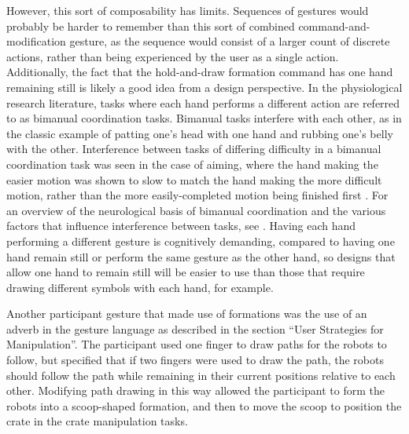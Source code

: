 However, this sort of composability has limits. 
Sequences of gestures would probably be harder to remember than this sort of combined command-and-modification gesture, as the sequence would consist of a larger count of discrete actions, rather than being experienced by the user as a single action. 
Additionally, the fact that the hold-and-draw formation command has one hand remaining still is likely a good idea from a design perspective. 
In the physiological research literature, tasks where each hand performs a different action are referred to as bimanual coordination tasks.
Bimanual tasks interfere with each other, as in the classic example of patting one's head with one hand and rubbing one's belly with the other. 
Interference between tasks of differing difficulty in a bimanual coordination task was seen in the case of aiming, where the hand making the easier motion was shown to slow to match the hand making the more difficult motion, rather than the more easily-completed motion being finished first \citep{fitts1954information}.
For an overview of the neurological basis of bimanual coordination and the various factors that influence interference between tasks, see \citep{swinnen2004two}. 
Having each hand performing a different gesture is cognitively demanding, compared to having one hand remain still or perform the same gesture as the other hand, so designs that allow one hand to remain still will be easier to use than those that require drawing different symbols with each hand, for example. 

Another participant gesture that made use of formations was the use of an adverb in the gesture language as described in the section ``User Strategies for Manipulation''. 
The participant used one finger to draw paths for the robots to follow, but specified that if two fingers were used to draw the path, the robots should follow the path while remaining in their current positions relative to each other. 
Modifying path drawing in this way allowed the participant to form the robots into a scoop-shaped formation, and then to move the scoop to position the crate in the crate manipulation tasks. 

